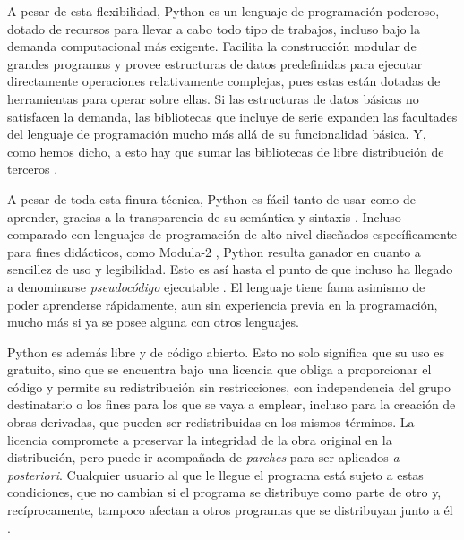 A pesar de esta flexibilidad, Python es un lenguaje de programación poderoso, dotado de recursos para llevar a cabo todo tipo de trabajos, incluso bajo la demanda computacional más exigente. Facilita la construcción modular de grandes programas y provee estructuras de datos predefinidas para ejecutar directamente operaciones relativamente complejas, pues estas están dotadas de herramientas para operar sobre ellas. Si las estructuras de datos básicas no satisfacen la demanda, las bibliotecas que incluye de serie expanden las facultades del lenguaje de programación mucho más allá de su funcionalidad básica. Y, como hemos dicho, a esto hay que sumar las bibliotecas de libre distribución de terceros \parencite[17-18]{lutz2013}.

A pesar de toda esta finura técnica, Python es fácil tanto de usar como de aprender, gracias a la transparencia de su semántica y sintaxis \parencite[xiii]{bird2009}. Incluso comparado con lenguajes de programación de alto nivel diseñados específicamente para fines didácticos, como Modula-2 , Python resulta ganador en cuanto a sencillez de uso y legibilidad. Esto es así hasta el punto de que incluso ha llegado a denominarse \textit{pseudocódigo} ejecutable \parencite[20]{lutz2013}. El lenguaje tiene fama asimismo de poder aprenderse rápidamente, aun sin experiencia previa en la programación, mucho más si ya se posee alguna con otros lenguajes.

Python es además libre y de código abierto. Esto no solo significa que su uso es gratuito, sino que se encuentra bajo una licencia que obliga a proporcionar el código y permite su redistribución sin restricciones, con independencia del grupo destinatario o los fines para los que se vaya a emplear, incluso para la creación de obras derivadas, que pueden ser redistribuidas en los mismos términos. La licencia compromete a preservar la integridad de la obra original en la distribución, pero puede ir acompañada de \textit{parches} para ser aplicados \textit{a posteriori}. Cualquier usuario al que le llegue el programa está sujeto a estas condiciones, que no cambian si el programa se distribuye como parte de otro y, recíprocamente, tampoco afectan a otros programas que se distribuyan junto a él \parencite{osi2007}.

